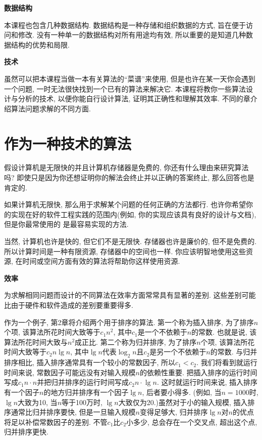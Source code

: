 \documentclass[oneside,10pt,fontset=none]{ctexbook}
\begin{document}
\textbf{数据结构}

本课程也包含几种数据结构. 数据结构是一种存储和组织数据的方式, 旨在便于访问和修改. 没有一种单一的数据结构对所有用途均有效, 所以重要的是知道几种数据结构的优势和局限.

\textbf{技术}

虽然可以把本课程当做一本有关算法的``菜谱''来使用, 但是也许在某一天你会遇到一个问题, 一时无法很快找到一个已有的算法来解决它. 本课程将教你一些算法设计与分析的技术, 以便你能自行设计算法, 证明其正确性和理解其效率. 不同的章介绍算法问题求解的不同方面.

\section{作为一种技术的算法}

假设计算机是无限快的并且计算机存储器是免费的, 你还有什么理由来研究算法吗? 即使只是因为你还想证明你的解法会终止并以正确的答案终止, 那么回答也是肯定的.

如果计算机无限快, 那么用于求解某个问题的任何正确的方法都行. 也许你希望你的实现在好的软件工程实践的范围内(例如, 你的实现应该具有良好的设计与文档), 但是你最常使用的
是最容易实现的方法.

当然, 计算机也许是快的, 但它们不是无限快. 存储器也许是廉价的, 但不是免费的. 所以计算时间是一种有限资源, 存储器中的空间也一样. 你应该明智地使用这些资源, 在时间或空间方面有效的算法将帮助你这样使用资源.

\textbf{效率}

为求解相同问题而设计的不同算法在效率方面常常具有显著的差别. 这些差别可能比由于硬件和软件造成的差别要重要得多.

作为一个例子, 第2章将介绍两个用于排序的算法. 第一个称为插入排序, 为了排序$n$个项, 该算法所花时间大致等于$c_1n^2$, 其中$c_1$是一个不依赖于$n$的常数. 也就是说, 该算法所花时间大致与$n^2$成正比. 第二个称为归并排序, 为了排序$n$个项, 该算法所花时间大致等于$c_2n\lg{n}$, 其中$\lg{n}$代表$\log_2n$且$c_2$是另一个不依赖于$n$的常数. 与归并排序相比, 插入排序通常具有一个较小的常数因子, 所以$c_1<c_2$. 我们将看到就运行时间来说, 常数因子可能远没有对输入规模$n$的依赖性重要. 把插入排序的运行时间写成$c_1n\cdot n$并把归并排序的运行时间写成$c_2n\cdot \lg{n}$. 这时就运行时间来说, 插入排序有一个因子$n$的地方归并排序有一个因子$\lg{n}$, 后者要小得多. (例如, 当$n=1000$时, $\lg{n}$大致为10, 当$n$等于100万时, $\lg{n}$大致仅为20.)虽然对于小的输入规模, 插入排序通常比归并排序要快, 但是一旦输入规模$n$变得足够大, 归并排序$\lg{n}$对$n$的优点将足以补偿常数因子的差别. 不管$c_1$比$c_2$小多少, 总会存在一个交叉点, 超出这个点, 归并排序更快.
\end{document}
